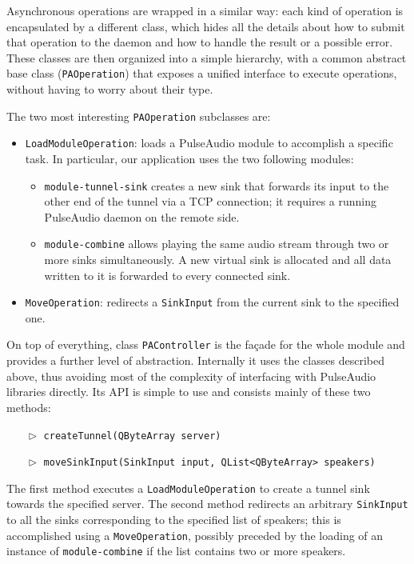 \documentclass[conference]{IEEEtran}
\begin{document}
Asynchronous operations are wrapped in a similar way: each kind of operation is encapsulated by a different class, which hides all the details about how to submit that operation to the daemon and how to handle the result or a possible error. These classes are then organized into a simple hierarchy, with a common abstract base class (\texttt{PAOperation}) that exposes a unified interface to execute operations, without having to worry about their type.

The two most interesting \texttt{PAOperation} subclasses are:
\begin{itemize}
	\item \texttt{LoadModuleOperation}: loads a PulseAudio module to accomplish a specific task. In particular, our application uses the two following modules:
	\begin{itemize}
		\item \texttt{module-tunnel-sink} creates a new sink that forwards its input to the other end of the tunnel via a TCP connection; it requires a running PulseAudio daemon on the remote side.
		\item \texttt{module-combine} allows playing the same audio stream through two or more sinks simultaneously. A new virtual sink is allocated and all data written to it is forwarded to every connected sink.
	\end{itemize}
	\item \texttt{MoveOperation}: redirects a \texttt{SinkInput} from the current sink to the specified one.
\end{itemize}

On top of everything, class \texttt{PAController} is the façade for the whole module and provides a further level of abstraction. Internally it uses the classes described above, thus avoiding most of the complexity of interfacing with PulseAudio libraries directly. Its API is simple to use and consists mainly of these two methods:
\begin{itemize}
\item[$\vartriangleright$] \texttt{createTunnel(QByteArray server)}
\item[$\vartriangleright$] \texttt{moveSinkInput(SinkInput input, QList<QByteArray> speakers)}
\end{itemize}
The first method executes a \texttt{LoadModuleOperation} to create a tunnel sink towards the specified server. The second method redirects an arbitrary \texttt{SinkInput} to all the sinks corresponding to the specified list of speakers; this is accomplished using a \texttt{MoveOperation}, possibly preceded by the loading of an instance of \texttt{module-combine} if the list contains two or more speakers.
\end{document}
